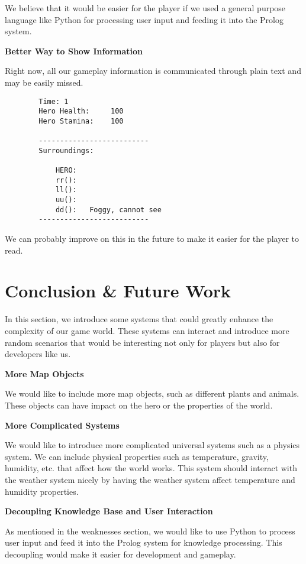 \documentclass[10pt]{article}
\begin{document}
We believe that it would be easier for the player if we used a general purpose language like Python for processing user input and feeding it into the Prolog system.


\textbf{Better Way to Show Information}

Right now, all our gameplay information is communicated through plain text and may be easily missed.

\begin{verbatim}
        Time: 1
        Hero Health:     100
        Hero Stamina:    100

        --------------------------
        Surroundings:

            HERO:
            rr():
            ll():
            uu():
            dd():   Foggy, cannot see
        --------------------------
\end{verbatim}

We can probably improve on this in the future to make it easier for the player to read.




\section{Conclusion \& Future Work}

In this section, we introduce some systems that could greatly enhance the complexity of our game world. These systems can interact and introduce more random scenarios that would be interesting not only for players but also for developers like us.

\textbf{More Map Objects}

We would like to include more map objects, such as different plants and animals. These objects can have impact on the hero or the properties of the world.

\textbf{More Complicated Systems}

We would like to introduce more complicated universal systems such as a physics system. We can include physical properties such as temperature, gravity, humidity, etc. that affect how the world works. This system should interact with the weather system nicely by having the weather system affect temperature and humidity properties.

\textbf{Decoupling Knowledge Base and User Interaction}

As mentioned in the weaknesses section, we would like to use Python to process user input and feed it into the Prolog system for knowledge processing. This decoupling would make it easier for development and gameplay.







\end{document}

